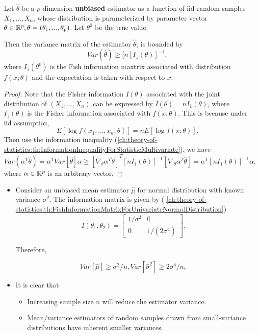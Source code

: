 \begin{refsection}
\begin{theorem}\label{ch:theory-of-statistics:th:CramerRaoLowerBoundMultivariateEstimation}
	Let $\hat{\theta}$ be a $p$-dimension \textbf{unbiased} estimator as a function of iid random samples $X_1,...,X_n$, whose distribution is parameterized by parameter vector $\theta\in \mathbb{R}^p, \theta = (\theta_1,...,\theta_p)$. Let $\theta^0$ be the true value.
	
		Then the variance matrix of the estimator $\hat{\theta}_i$ is bounded by
	$$Var(\hat{\theta}) \geq [n[I_1(\theta)]^{-1},$$
	where $I_1(\theta^0)$ is the Fish information maxtrix associated with distribution $f(x;\theta)$ and the expectation is taken with respect to $x$.	
\end{theorem}
\begin{proof}
	Note that the Fisher information $I(\theta)$ associated with the joint distribution of $(X_1,...,X_n)$ can be expressed by $I(\theta) = nI_1(\theta)$, where $I_1(\theta)$ is the Fisher information associated with $f(x,\theta)$. This is because under iid assumption, 
	$$E[\log f(x_1,...,x_n;\theta)] = n E[\log f(x;\theta)].$$
	Then use the information inequality (\autoref{ch:theory-of-statistics:th:InformationInequalityForStatisticMultivariate}), we have
	$$Var(\alpha^T \hat{\theta}) = \alpha^TVar[\hat{\theta}]\alpha \geq [\nabla_{\theta}\alpha^T\hat{\theta}]^T [nI_1(\theta)]^{-1}[\nabla_{\theta}\alpha^T\hat{\theta}] = \alpha^T [nI_1(\theta)]^{-1} \alpha,$$
	where $\alpha\in\mathbb{R}^p$ is an arbitrary vector.
\end{proof}

\begin{example}\hfill
	\begin{itemize}
		\item Consider an unbiased mean estimator $\hat{\mu}$ for normal distribution with known variance $\sigma^2$. The information matrix is given by ( \autoref{ch:theory-of-statistics:th:FishInformationMatrixForUnivariateNormalDistribution})
		$$I(\theta_1,\theta_2) = \begin{bmatrix}
		1/\sigma^2 & 0 \\
		0 & 1/(2\sigma^4)
		\end{bmatrix}. $$
		
		Therefore, 
		
		$$Var[\hat{\mu}] \geq \sigma^2/n, Var[\hat{\sigma}^2] \geq 2\sigma^4/n, $$
			
		\item 	It is clear that
		\begin{itemize}
			\item Increasing sample size $n$ will reduce the estimator variance.
			\item Mean/variance estimators of random samples drawn from small-variance distributions have inherent smaller variances.
		\end{itemize}
	\end{itemize}	
\end{example}


\end{refsection}
